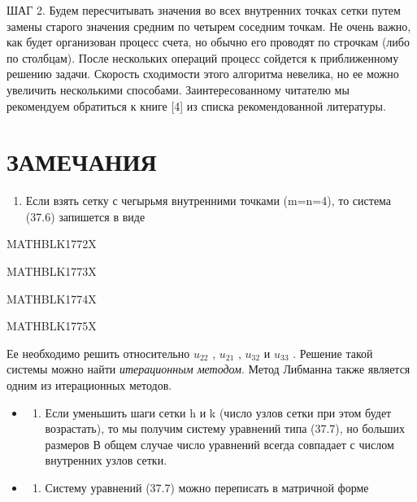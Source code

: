 \documentclass[
]{article}
\providecommand{\tightlist}{%
  \setlength{\itemsep}{0pt}\setlength{\parskip}{0pt}}
\begin{document}
{{{ШАГ 2. Будем пересчитывать значения во всех внутренних точках сетки
путем замены старого значения средним по четырем соседним точкам. Не
очень важно, как будет организован процесс счета, но обычно его проводят
по строчкам (либо по столбцам). После нескольких операций процесс
сойдется к приближенному решению задачи. Скорость сходимости этого
алгоритма невелика, но ее можно увеличить несколькими способами.
Заинтересованному читателю мы рекомендуем обратиться к книге {[}4{]} из
списка рекомендованной литературы.

\section{ЗАМЕЧАНИЯ}\label{ux437ux430ux43cux435ux447ux430ux43dux438ux44f-16}

\begin{enumerate}
\def\labelenumi{\arabic{enumi}.}
\tightlist
\item
  Если взять сетку с чегырьмя внутренними точками (m=n=4), то система
  (37.6) запишется в виде
\end{enumerate}

MATHBLK1772X

MATHBLK1773X

MATHBLK1774X

MATHBLK1775X

Ее необходимо решить относительно \(u_{22}\) , \(u_{21}\) , \(u_{32}\) и
\(u_{33}\) . Решение такой системы можно найти \emph{итерационным
методом}. Метод Либманна также является одним из итерационных методов.

\begin{itemize}
\tightlist
\item
  \begin{enumerate}
  \def\labelenumi{\arabic{enumi}.}
  \setcounter{enumi}{1}
  \tightlist
  \item
    Если уменьшить шаги сетки h и k (число узлов сетки при этом будет
    возрастать), то мы получим систему уравнений типа (37.7), но больших
    размеров В общем случае число уравнений всегда совпадает с числом
    внутренних узлов сетки.
  \end{enumerate}
\item
  \begin{enumerate}
  \def\labelenumi{\arabic{enumi}.}
  \setcounter{enumi}{2}
  \tightlist
  \item
    Систему уравнений (37.7) можно переписать в матричной форме
  \end{enumerate}
\end{itemize}

}}}
\end{document}
